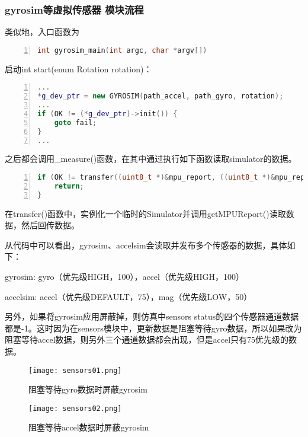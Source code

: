 \subsubsection{gyrosim等虚拟传感器 模块流程}
类似地，入口函数为
\begin{lstlisting}[language=c++,numbers=left,firstnumber = 1,breaklines = true,numberstyle=\tiny,keywordstyle=\color{blue!70},commentstyle=\color{red!50!green!50!blue!50},frame=shadowbox, rulesepcolor=\color{red!20!green!20!blue!20}]
int gyrosim_main(int argc, char *argv[])
\end{lstlisting}
启动int start(enum Rotation rotation)：
\begin{lstlisting}[language=c++,numbers=left,firstnumber = 1,breaklines = true,numberstyle=\tiny,keywordstyle=\color{blue!70},commentstyle=\color{red!50!green!50!blue!50},frame=shadowbox, rulesepcolor=\color{red!20!green!20!blue!20}]
...
*g_dev_ptr = new GYROSIM(path_accel, path_gyro, rotation);
...
if (OK != (*g_dev_ptr)->init()) {
	goto fail;
}
...
\end{lstlisting}
之后都会调用_measure()函数，在其中通过执行如下函数读取simulator的数据。
\begin{lstlisting}[language=c++,numbers=left,firstnumber = 1,breaklines = true,numberstyle=\tiny,keywordstyle=\color{blue!70},commentstyle=\color{red!50!green!50!blue!50},frame=shadowbox, rulesepcolor=\color{red!20!green!20!blue!20}]
if (OK != transfer((uint8_t *)&mpu_report, ((uint8_t *)&mpu_report), sizeof(mpu_report))) {
	return;
}
\end{lstlisting}
在transfer()函数中，实例化一个临时的Simulator并调用getMPUReport()读取数据，然后回传数据。

从代码中可以看出，gyrosim、accelsim会读取并发布多个传感器的数据，具体如下：

\noindent gyrosim: gyro（优先级HIGH，100），accel（优先级HIGH，100）

\noindent accelsim: accel（优先级DEFAULT，75），mag（优先级LOW，50）

另外，如果将gyrosim应用屏蔽掉，则仿真中sensors status的四个传感器通道数据都是-1。这时因为在sensors模块中，更新数据是阻塞等待gyro数据，所以如果改为阻塞等待accel数据，则另外三个通道数据都会出现，但是accel只有75优先级的数据。
\begin{figure}[htbp]
	\figskip
	\centering
	\texttt{[image: sensors01.png]}	  
	\caption{\label{fig: 1} 阻塞等待gyro数据时屏蔽gyrosim}
\end{figure}

\begin{figure}[htbp]
	\figskip
	\centering
	\texttt{[image: sensors02.png]}	  
	\caption{\label{fig: 2} 阻塞等待accel数据时屏蔽gyrosim}
\end{figure}

